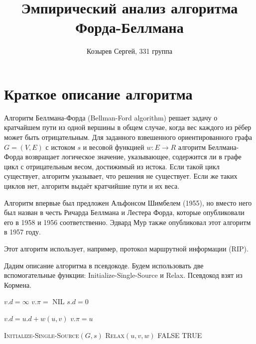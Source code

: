 \documentclass[a4paper,12pt]{article}
\newcommand{\TITLE}[1]{\item[#1]}
\begin{document}
\title{Эмпирический анализ алгоритма Форда-Беллмана}
\author{Козырев Сергей, 331 группа}
\maketitle
\newpage
\tableofcontents

\newpage
\section{Краткое описание алгоритма}
Алгоритм Беллмана-Форда (Bellman-Ford algorithm) решает задачу о кратчайшем 
пути из одной вершины в общем случае, когда вес каждого из рёбер может быть 
отрицательным.
Для заданного взвешенного ориентированного графа $G = (V, E)$ с
истоком $s$ и весовой функцией $w : E \rightarrow R$ алгоритм Беллмана-Форда 
возвращает логическое значение, указывающее, содержится ли в графе цикл с 
отрицательным весом, достижимый из истока.
Если такой цикл существует, алгоритм указывает, что решения не существует.
Если же таких циклов нет, алгоритм выдаёт кратчийшие пути и их
веса.\cite{cormen}

Алгоритм впервые был предложен Альфонсом Шимбелем (1955), но вместо него был 
назван в честь Ричарда Беллмана и Лестера Форда, которые опубликовали его в 
1958 и 1956 соответственно.
Эдвард Мур также опубликовал этот алгоритм в 1957 году.\cite{schrijver}

Этот алгоритм использует, например, протокол маршрутной информации 
(RIP).\cite{semenov}

Дадим описание алгоритма в псевдокоде.
Будем использовать две вспомогательные функции: 
Initialize-Single-Source и Relax.
Псевдокод взят из Кормена.\cite{cormen}
\begin{algorithmic}[1]
  \TITLE{\textsc{Initialize-Single-Source}$(G, s)$}
    \STATE $v.d = \infty$
    \STATE $v.\pi =$ NIL
  \ENDFOR
  \STATE $s.d = 0$
\end{algorithmic}
\begin{algorithmic}[1]
  \TITLE{\textsc{Relax}$(u, v, w)$}
    \STATE $v.d = u.d + w(u, v)$
    \STATE $v.\pi = u$
  \ENDIF
\end{algorithmic}
\begin{algorithmic}[1]
  \TITLE{\textsc{Bellman-Ford}$(G, w, s)$}
  \STATE \textsc{Initialize-Single-Source}$(G, s)$
      \STATE \textsc{Relax}$(u, v, w)$
    \ENDFOR
  \ENDFOR
      \RETURN FALSE
    \ENDIF
  \ENDFOR
  \RETURN TRUE
\end{algorithmic}
\end{document}
